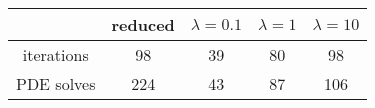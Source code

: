 \begin{tabular}{ccccc}
& reduced & $\lambda = 0.1$ & $\lambda = 1$ & $\lambda = 10$ \\
\hline
iterations & 98 & 39 & 80 & 98 \\
PDE solves & 224 & 43 & 87 & 106 \\
\hline
\end{tabular}
